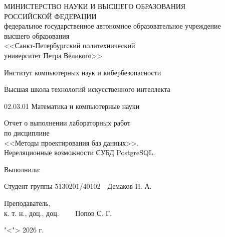 \documentclass[11pt, a4paper]{article}
\begin{document}
	\thispagestyle{empty}
	\begin{center}
		{\Large МИНИСТЕРСТВО НАУКИ И ВЫСШЕГО ОБРАЗОВАНИЯ\\
			РОССИЙСКОЙ ФЕДЕРАЦИИ\\	
			федеральное государственное автономное образовательное учреждение\\
			высшего образования\\
			<<Санкт-Петербургский политехнический\\
			университет Петра Великого>>}
		
		\vspace{7pt}
		
		{\large Институт компьютерных наук и кибербезопасности
			
			\vspace{7pt}
			
			Высшая школа технологий искусственного интеллекта
			
			\vspace{7pt}
			
			02.03.01 Математика и компьютерные науки}
		
		\vspace{100pt}
		
		\begin{LARGE}
			Отчет о выполнении лабораторных работ\\
			по дисциплине\\
			<<Методы проектирования баз данных>>.\\
			Нереляционные возможности СУБД PostgreSQL.\\
		\end{LARGE}
	\end{center}
	
	\vfill
	
	\begin{flushleft}
		\begin{small}
			Выполнили:
			
			\vspace{5pt}
			
			Студент группы 5130201/40102\hfill \underline{\hspace{3cm}}~~Демаков Н. А.
			
			\vspace{20pt}
			
			Преподаватель,\\
			к. т. н., доц., доц. \hfill \underline{\hspace{3cm}}\,\,\,\,\,\,\,\,\,\,\,\,Попов С. Г.
			
			\vspace{35pt}
			
			\hfill"<\underline{\hspace{1cm}}">\underline{\hspace{2.5cm}} 2026 г.\hspace{0.5cm}
			
		\end{small}
	\end{flushleft}
	
\end{document}
